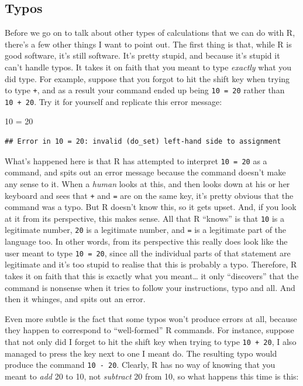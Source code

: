 \documentclass[
]{book}
\newenvironment{Shaded}{\begin{snugshade}}{\end{snugshade}}
\newcommand{\DecValTok}[1]{\textcolor[rgb]{0.00,0.00,0.81}{#1}}
\newcommand{\OtherTok}[1]{\textcolor[rgb]{0.56,0.35,0.01}{#1}}
\begin{document}
\hypertarget{typos}{%
\subsection{Typos}\label{typos}}

Before we go on to talk about other types of calculations that we can do with R, there's a few other things I want to point out. The first thing is that, while R is good software, it's still software. It's pretty stupid, and because it's stupid it can't handle typos. It takes it on faith that you meant to type \emph{exactly} what you did type. For example, suppose that you forgot to hit the shift key when trying to type \texttt{+}, and as a result your command ended up being \texttt{10\ =\ 20} rather than \texttt{10\ +\ 20}. Try it for yourself and replicate this error message:

\begin{Shaded}
\begin{Highlighting}[]
\DecValTok{10} \OtherTok{=} \DecValTok{20}
\end{Highlighting}
\end{Shaded}

\begin{verbatim}
## Error in 10 = 20: invalid (do_set) left-hand side to assignment
\end{verbatim}

What's happened here is that R has attempted to interpret \texttt{10\ =\ 20} as a command, and spits out an error message because the command doesn't make any sense to it. When a \emph{human} looks at this, and then looks down at his or her keyboard and sees that \texttt{+} and \texttt{=} are on the same key, it's pretty obvious that the command was a typo. But R doesn't know this, so it gets upset. And, if you look at it from its perspective, this makes sense. All that R ``knows'' is that \texttt{10} is a legitimate number, \texttt{20} is a legitimate number, and \texttt{=} is a legitimate part of the language too. In other words, from its perspective this really does look like the user meant to type \texttt{10\ =\ 20}, since all the individual parts of that statement are legitimate and it's too stupid to realise that this is probably a typo. Therefore, R takes it on faith that this is exactly what you meant\ldots{} it only ``discovers'' that the command is nonsense when it tries to follow your instructions, typo and all. And then it whinges, and spits out an error.

Even more subtle is the fact that some typos won't produce errors at all, because they happen to correspond to ``well-formed'' R commands. For instance, suppose that not only did I forget to hit the shift key when trying to type \texttt{10\ +\ 20}, I also managed to press the key next to one I meant do. The resulting typo would produce the command \texttt{10\ -\ 20}. Clearly, R has no way of knowing that you meant to \emph{add} 20 to 10, not \emph{subtract} 20 from 10, so what happens this time is this:
\end{document}
